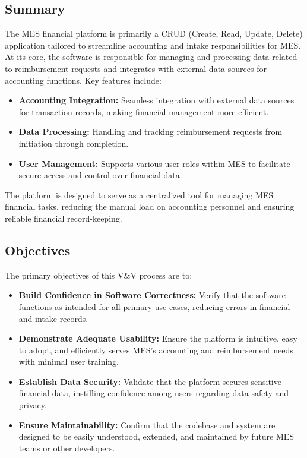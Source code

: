 \documentclass[12pt, titlepage]{article}
\begin{document}
\subsection{Summary}

The MES financial platform is primarily a CRUD (Create, Read, Update, Delete) application tailored to streamline accounting and intake responsibilities for MES. At its core, the software is responsible for managing and processing data related to reimbursement requests and integrates with external data sources for accounting functions. Key features include:

\begin{itemize}
    \item \textbf{Accounting Integration:} Seamless integration with external data sources for transaction records, making financial management more efficient.
    \item \textbf{Data Processing:} Handling and tracking reimbursement requests from initiation through completion.
    \item \textbf{User Management:} Supports various user roles within MES to facilitate secure access and control over financial data.
\end{itemize}

The platform is designed to serve as a centralized tool for managing MES financial tasks, reducing the manual load on accounting personnel and ensuring reliable financial record-keeping.

\subsection{Objectives}

The primary objectives of this V\&V process are to:

\begin{itemize}
    \item \textbf{Build Confidence in Software Correctness:} Verify that the software functions as intended for all primary use cases, reducing errors in financial and intake records.
    \item \textbf{Demonstrate Adequate Usability:} Ensure the platform is intuitive, easy to adopt, and efficiently serves MES's accounting and reimbursement needs with minimal user training.
    \item \textbf{Establish Data Security:} Validate that the platform secures sensitive financial data, instilling confidence among users regarding data safety and privacy.
    \item \textbf{Ensure Maintainability:} Confirm that the codebase and system are designed to be easily understood, extended, and maintained by future MES teams or other developers.
\end{itemize}
\end{document}

